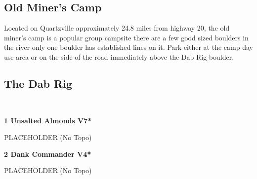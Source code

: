 \begin{multicols}{2}
		\section{Old Miner's Camp}\label{sa:Old Miner's Camp}
	\begin{minipage}{\columnwidth}
	Located on Quartzville approximately 24.8 miles from highway 20, the old miner's camp is a popular group campsite there are a few good sized boulders in the river only one boulder has established lines on it. Park either at the camp day use area or on the side of the road immediately above the Dab Rig boulder.
	\end{minipage}
			\subsection*{The Dab Rig}\label{bf:The Dab Rig}
			\begin{minipage}{\columnwidth}
			\
			\end{minipage}
			
					\begin{minipage}{\linewidth}	
					\label{rt:Unsalted Almonds}
\colorbox{Goldenrod!50}{
\textbf{
1 Unsalted Almonds V7*  
}
}

					\begin{adjustwidth}{0.5cm}{}				
					PLACEHOLDER
						\newline (No Topo) 
					\end{adjustwidth}
					\end{minipage}
					\begin{minipage}{\linewidth}	
					\label{rt:Dank Commander}
\colorbox{RoyalBlue!20}{
\textbf{
2 Dank Commander V4*  
}
}

					\begin{adjustwidth}{0.5cm}{}				
					PLACEHOLDER
						\newline (No Topo) 
					\end{adjustwidth}
					\end{minipage}
\end{multicols}
\clearpage